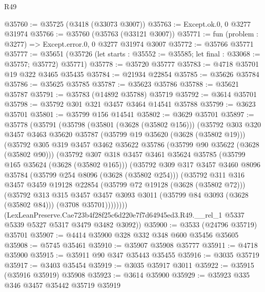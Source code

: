 \begin{lexlean}{R49}
\begin{coremodule}
@35760 := @35725 (@3418 (@33073 @3007))
@35763 := Except.ok.{0, 0} @3277 @31974
@35766 := @35760 (@35763 (@33121 @3007))
@35771 := fun (problem : @3277) => Except.error.{0, 0} @3277 @31974 @3007
@35772 := @35766 @35771
@35777 := @35651
    (@35726 (let starts : @35552 := @35585; let final : @33068 := @35757; @35772) @35771)
@35778 := @35720 @35777
@35783 := @4718 @35701 @19 @322 @3465 @35435
@35784 := @21934 @22854
@35785 := @35626 @35784
@35786 := @35625 @35785
@35787 := @35623 @35786
@35788 := @35621 @35787
@35791 := @35783 (@14892 @35788) @35719
@35792 := @3614 @35701
@35798 := @35792 @301 @321 @3457 @3464 @14541 @35788
@35799 := @3623 @35701
@35801 := @35799 @156 @14541
@35802 := @3629 @35701
@35897 := @35778
    (@35791
      (@35798
        (@35801 (@3628 (@35802 @156)))
        (@35792
          @303
          @320
          @3457
          @3463
          @35620
          @35787
          (@35799 @19 @35620 (@3628 (@35802 @19)))
          (@35792
            @305
            @319
            @3457
            @3462
            @35622
            @35786
            (@35799 @90 @35622 (@3628 (@35802 @90)))
            (@35792
              @307
              @318
              @3457
              @3461
              @35624
              @35785
              (@35799 @165 @35624 (@3628 (@35802 @165)))
              (@35792
                @309
                @317
                @3457
                @3460
                @8096
                @35784
                (@35799 @254 @8096 (@3628 (@35802 @254)))
                (@35792
                  @311
                  @316
                  @3457
                  @3459
                  @19128
                  @22854
                  (@35799 @72 @19128 (@3628 (@35802 @72)))
                  (@35792
                    @313
                    @315
                    @3457
                    @3457
                    @3093
                    @3011
                    (@35799 @84 @3093 (@3628 (@35802 @84)))
                    (@3708 @35701))))))))
      (LexLeanPreserve.Cae723b4f28f25c6d220e7f7d64945ed3.R49.__rel_1
        @5337
        @5339
        @5327
        @5317
        @3479
        @3482
        @3092))
@35900 := @3533 (@24796 @35719) @35701
@35907 := @4414 @35900 @328 @332 @348 @600 @35456 @35605
@35908 := @5745 @35461
@35910 := @35907 @35908 @35777
@35911 := @4718 @35900
@35915 := @35911 @90 @347 @35443 @35455
@35916 := @3035 @35719
@35917 := @3403 @35454
@35919 := @3035 @35917 @3011
@35922 := @35915 (@35916 @35919) @35908
@35923 := @3614 @35900
@35929 := @35923 @335 @346 @3457 @35442 @35719 @35919

\end{coremodule}
\end{lexlean}
